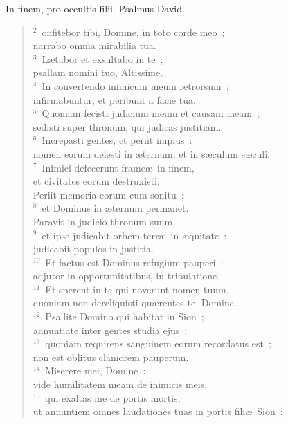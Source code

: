 \bchapter[Psalm]
In finem, pro occultis filii. Psalmus David.
\begin{verse}${}^{2}$~onfitebor tibi, Domine, in toto corde meo~;\\ narrabo omnia mirabilia tua.\\
${}^{3}$~L\ae tabor et exsultabo in te~;\\ psallam nomini tuo, Altissime.\\
${}^{4}$~In convertendo inimicum meum retrorsum~;\\ infirmabuntur, et peribunt a facie tua.\\
${}^{5}$~Quoniam fecisti judicium meum et causam meam~;\\ sedisti super thronum, qui judicas justitiam.\\
${}^{6}$~Increpasti gentes, et periit impius~:\\ nomen eorum delesti in \ae ternum, et in s\ae culum s\ae culi.\\
${}^{7}$~Inimici defecerunt frame\ae\ in finem,\\ et civitates eorum destruxisti.\\ Periit memoria eorum cum sonitu~;\\
${}^{8}$~et Dominus in \ae ternum permanet.\\ Paravit in judicio thronum suum,\\
${}^{9}$~et ipse judicabit orbem terr\ae\ in \ae quitate~:\\ judicabit populos in justitia.\\
${}^{10}$~Et factus est Dominus refugium pauperi~;\\ adjutor in opportunitatibus, in tribulatione.\\
${}^{11}$~Et sperent in te qui noverunt nomen tuum,\\ quoniam non dereliquisti qu\ae rentes te, Domine.\\
${}^{12}$~Psallite Domino qui habitat in Sion~;\\ annuntiate inter gentes studia ejus~:\\
${}^{13}$~quoniam requirens sanguinem eorum recordatus est~;\\ non est oblitus clamorem pauperum.\\
${}^{14}$~Miserere mei, Domine~:\\ vide humilitatem meam de inimicis meis,\\
${}^{15}$~qui exaltas me de portis mortis,\\ ut annuntiem omnes laudationes tuas in portis fili\ae\ Sion~:\\

\end{verse}
